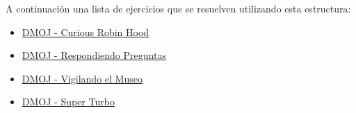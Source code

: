 A continuación una lista de ejercicios que se resuelven utilizando esta estructura:

\begin{itemize}
	\item \href{https://dmoj.uclv.edu.cu/problem/curiousrobinhood}{DMOJ - Curious Robin Hood} 
    \item \href{https://dmoj.uclv.edu.cu/problem/consulta}{DMOJ - Respondiendo Preguntas}
	\item \href{https://dmoj.uclv.edu.cu/problem/museo}{DMOJ - Vigilando el Museo }
	\item \href{https://dmoj.uclv.edu.cu/problem/turbo}{DMOJ - Super Turbo}
\end{itemize}